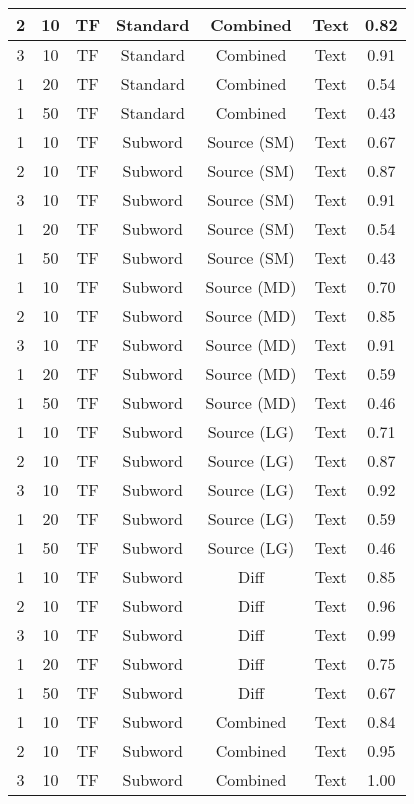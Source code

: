 \begin{longtable}{|c|c|c|c|c|c|c|}
\hline
2 & 10 & TF & Standard & Combined & Text & 0.82 \\
\hline
3 & 10 & TF & Standard & Combined & Text & 0.91 \\
\hline
1 & 20 & TF & Standard & Combined & Text & 0.54 \\
\hline
1 & 50 & TF & Standard & Combined & Text & 0.43 \\
\hline
1 & 10 & TF & Subword & Source (SM) & Text & 0.67 \\
\hline
2 & 10 & TF & Subword & Source (SM) & Text & 0.87 \\
\hline
3 & 10 & TF & Subword & Source (SM) & Text & 0.91 \\
\hline
1 & 20 & TF & Subword & Source (SM) & Text & 0.54 \\
\hline
1 & 50 & TF & Subword & Source (SM) & Text & 0.43 \\
\hline
1 & 10 & TF & Subword & Source (MD) & Text & 0.70 \\
\hline
2 & 10 & TF & Subword & Source (MD) & Text & 0.85 \\
\hline
3 & 10 & TF & Subword & Source (MD) & Text & 0.91 \\
\hline
1 & 20 & TF & Subword & Source (MD) & Text & 0.59 \\
\hline
1 & 50 & TF & Subword & Source (MD) & Text & 0.46 \\
\hline
1 & 10 & TF & Subword & Source (LG) & Text & 0.71 \\
\hline
2 & 10 & TF & Subword & Source (LG) & Text & 0.87 \\
\hline
3 & 10 & TF & Subword & Source (LG) & Text & 0.92 \\
\hline
1 & 20 & TF & Subword & Source (LG) & Text & 0.59 \\
\hline
1 & 50 & TF & Subword & Source (LG) & Text & 0.46 \\
\hline
1 & 10 & TF & Subword & Diff & Text & 0.85 \\
\hline
2 & 10 & TF & Subword & Diff & Text & 0.96 \\
\hline
3 & 10 & TF & Subword & Diff & Text & 0.99 \\
\hline
1 & 20 & TF & Subword & Diff & Text & 0.75 \\
\hline
1 & 50 & TF & Subword & Diff & Text & 0.67 \\
\hline
1 & 10 & TF & Subword & Combined & Text & 0.84 \\
\hline
2 & 10 & TF & Subword & Combined & Text & 0.95 \\
\hline
3 & 10 & TF & Subword & Combined & Text & 1.00 \\

\end{longtable}
